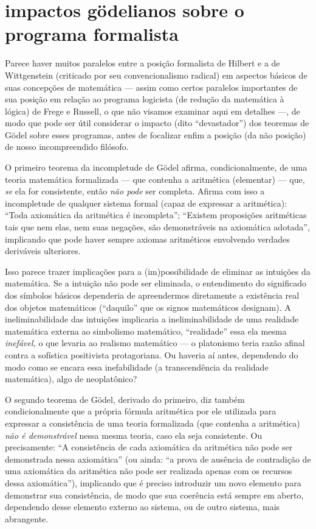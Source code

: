{\section{impactos gödelianos sobre o programa
formalista} 

Parece haver muitos paralelos entre a posição formalista de
Hilbert e a de Wittgenstein (criticado por seu convencionalismo
radical) em aspectos básicos de suas concepções de matemática ---
assim como certos paralelos importantes de sua posição em
relação ao programa logicista (de redução da matemática à
lógica) de Frege e Russell, o que não visamos examinar aqui em
detalhes ---, de modo que pode ser útil considerar o impacto (dito
“devastador”) dos teoremas de Gödel sobre esses programas, antes
de focalizar enfim a posição (da não posição) de nosso
incompreendido filósofo.

O primeiro teorema da incompletude de Gödel afirma,
condicionalmente, de uma teoria matemática formalizada --- que
contenha a aritmética (elementar) --- que, \emph{se} ela for
consistente, então \emph{não pode} ser completa. Afirma com
isso a incompletude de qualquer sistema formal (capaz de
expressar a aritmética): “Toda axiomática da aritmética é
incompleta”; “Existem proposições aritméticas tais que nem elas,
nem suas negações, são demonstráveis na axiomática adotada”,
implicando que pode haver sempre axiomas aritméticos envolvendo
verdades deriváveis ulteriores.

Isso parece trazer implicações para a (im)possibilidade de
eliminar as intuições da matemática. Se a intuição não pode ser
eliminada, o entendimento do significado dos símbolos básicos
dependeria de apreendermos diretamente a existência real dos
objetos matemáticos (``daquilo''
que os signos matemáticos designam). A ineliminabilidade das
intuições implicaria a ineliminabilidade de uma realidade
matemática externa ao simbolismo matemático,
``realidade'' essa ela mesma
\emph{inefável,} o que levaria ao realismo matemático --- o
platonismo teria razão afinal contra a sofística positivista
protagoriana. Ou haveria aí antes, dependendo do modo como se
encara essa inefabilidade (a transcendência da realidade
matemática), algo de neoplatônico?

O segundo teorema de Gödel, derivado do primeiro, diz também
condicionalmente que a própria fórmula aritmética por ele
utilizada para expressar a consistência de uma teoria
formalizada (que contenha a aritmética) \emph{não é
demonstrável} nessa mesma teoria, caso ela seja consistente. Ou
precisamente: “A consistência de cada axiomática da aritmética
não pode ser demonstrada nessa axiomática” (ou ainda: “a prova
de ausência de contradição de uma axiomática da aritmética não
pode ser realizada apenas com os recursos dessa axiomática”),
implicando que é preciso introduzir um novo elemento para
demonstrar sua consistência, de modo que sua coerência está
sempre em aberto, dependendo desse elemento externo ao sistema,
ou de outro sistema, mais abrangente.

}
